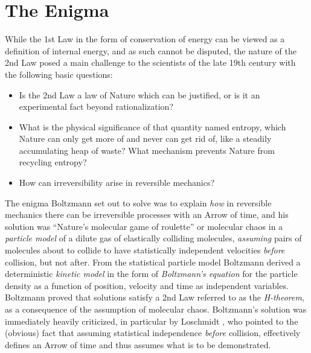 \section{The Enigma}
While the 1st Law in the form of conservation of
energy can be viewed as a definition of internal 
energy, and as such cannot be disputed, the nature of the 2nd Law 
posed a main challenge to the scientists 
of the late 19th century with the following basic questions: 
\begin{itemize}
\item Is the 2nd Law a law of Nature which can be justified,
or is it an experimental fact beyond rationalization? 
\item What is the physical significance of that quantity named entropy, 
which Nature can only get more of and never can get rid of, like 
a steadily accumulating heap of waste? What mechanism prevents Nature 
from recycling entropy?
\item How can irreversibility arise in reversible mechanics?   
\end{itemize}
The enigma Boltzmann set out to solve was to explain \emph{how} 
in reversible mechanics there can be irreversible processes 
with an Arrow of time, and his solution was 
``Nature's molecular game of roulette''  or molecular chaos 
in a \emph{particle model} of a dilute gas of elastically colliding 
molecules, \emph{assuming} pairs of 
molecules about to collide 
to have statistically independent velocities \emph{before} collision,
but not after. From the statistical particle model Boltzmann
derived a deterministic \emph{kinetic model} in the form
of \emph{Boltzmann's equation} for the particle density as 
a function of position, velocity and time as independent
variables. Boltzmann proved that solutions
satisfy a 2nd Law referred to as the \emph{H-theorem},
as a consequence of the assumption of molecular chaos. 
Boltzmann's solution was immediately heavily criticized, in particular  
by Loschmidt \cite{loschmidt}, who pointed to the (obvious)
fact that assuming statistical independence \emph{before} collision,
effectively defines an Arrow of time and thus assumes what is to
be demonstrated.  


